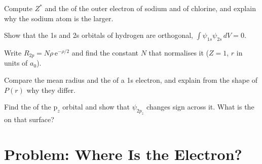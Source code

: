 \begin{exercise}[$\star\star$]\label{exo:b2:atomic-orbitals:8}
Compute $Z^*$ and the  of the outer electron of sodium and of
chlorine, and explain why the sodium atom is the larger.
\end{exercise}

\begin{exercise}[$\star\star$]\label{exo:b2:atomic-orbitals:9}
Show that the 1s and 2s orbitals of hydrogen are orthogonal,
$\int\psi_{1s}\psi_{2s}\,dV = 0$.
\end{exercise}

\begin{exercise}[$\star\star\star$]\label{exo:b2:atomic-orbitals:10}
Write $R_{2p} = N\rho\,\mathrm e^{-\rho/2}$ and find the constant $N$ that normalises it
($Z = 1$, $r$ in units of $a_0$).
\end{exercise}

\begin{exercise}[$\star\star\star$]\label{exo:b2:atomic-orbitals:11}
Compare the mean radius and the  of a 1s electron, and
explain from the shape of $P(r)$ why they differ.
\end{exercise}

\begin{exercise}[$\star\star\star$]\label{exo:b2:atomic-orbitals:12}
Find the  of the $\mathrm p_z$ orbital and show that $\psi_{2p_z}$
changes sign across it. What is the  on that surface?
\end{exercise}

\section{Problem: Where Is the Electron?}

